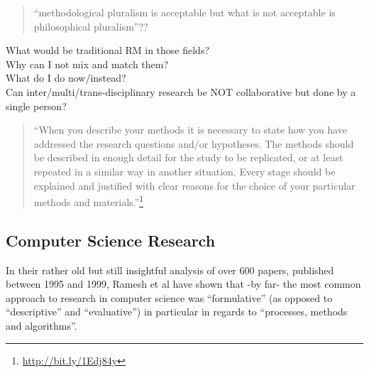\begin{quote}
  ``methodological pluralism is acceptable but what is not acceptable is philosophical pluralism''??
\end{quote}

\begin{fcom}
  What would be traditional RM in those fields?\\
  Why can I not mix and match them?\\
  What do I do now/instead?\\
  Can inter/multi/trans-disciplinary research be NOT collaborative but done by a single person?
\end{fcom}

\begin{quote}
  ``When you describe your methods it is necessary to state how you have addressed the research questions and/or hypotheses. The methods should be described in enough detail for the study to be replicated, or at least repeated in a similar way in another situation. Every stage should be explained and justified with clear reasons for the choice of your particular methods and materials.''\footnote{\url{http://bit.ly/1Edj84y}} %
\end{quote}

\subsection{Computer Science Research}

In their rather old but still insightful analysis of over 600 papers, published between 1995 and 1999, Ramesh et al \autocite{Ramesh2004} have shown that -by far- the most common approach to research in computer science was ``formulative'' (as opposed to ``descriptive'' and ``evaluative'') in particular in regards to ``processes, methods and algorithms''.

